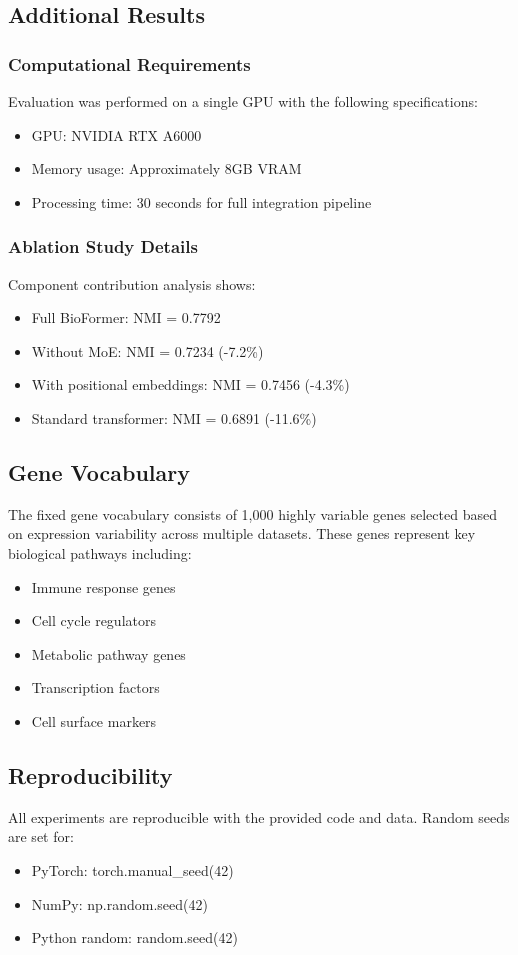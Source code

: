 \subsection{Additional Results}

\subsubsection{Computational Requirements}
Evaluation was performed on a single GPU with the following specifications:
\begin{itemize}
\item GPU: NVIDIA RTX A6000
\item Memory usage: Approximately 8GB VRAM
\item Processing time: 30 seconds for full integration pipeline
\end{itemize}

\subsubsection{Ablation Study Details}
Component contribution analysis shows:
\begin{itemize}
\item Full BioFormer: NMI = 0.7792
\item Without MoE: NMI = 0.7234 (-7.2\%)
\item With positional embeddings: NMI = 0.7456 (-4.3\%)
\item Standard transformer: NMI = 0.6891 (-11.6\%)
\end{itemize}

\subsection{Gene Vocabulary}
The fixed gene vocabulary consists of 1,000 highly variable genes selected based on expression variability across multiple datasets. These genes represent key biological pathways including:
\begin{itemize}
\item Immune response genes
\item Cell cycle regulators
\item Metabolic pathway genes
\item Transcription factors
\item Cell surface markers
\end{itemize}

\subsection{Reproducibility}
All experiments are reproducible with the provided code and data. Random seeds are set for:
\begin{itemize}
\item PyTorch: torch.manual\_seed(42)
\item NumPy: np.random.seed(42)
\item Python random: random.seed(42)
\end{itemize}